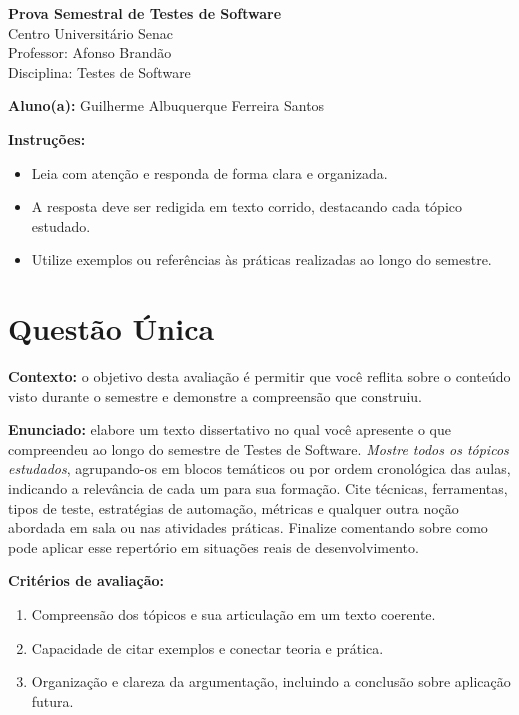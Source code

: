 \documentclass[12pt]{article}
\begin{document}
\newpage


\begin{center}
  {\Large \textbf{Prova Semestral de Testes de Software}}\\
  Centro Universitário Senac\\
  Professor: Afonso Brandão\\
  Disciplina: Testes de Software
\end{center}

\vspace{0.4cm}

\begin{center}
  \textbf{Aluno(a):} Guilherme Albuquerque Ferreira Santos
\end{center}

\vspace{0.5cm}

\begin{center}
  \textbf{Instruções:}
\end{center}
\begin{itemize}[leftmargin=*]
  \item Leia com atenção e responda de forma clara e organizada.
  \item A resposta deve ser redigida em texto corrido, destacando cada tópico estudado.
  \item Utilize exemplos ou referências às práticas realizadas ao longo do semestre.
\end{itemize}

\section*{Questão Única}
\textbf{Contexto:} o objetivo desta avaliação é permitir que você reflita sobre o conteúdo visto durante o semestre e demonstre a compreensão que construiu.

\textbf{Enunciado:} elabore um texto dissertativo no qual você apresente o que compreendeu ao longo do semestre de Testes de Software. \textit{Mostre todos os tópicos estudados}, agrupando-os em blocos temáticos ou por ordem cronológica das aulas, indicando a relevância de cada um para sua formação. Cite técnicas, ferramentas, tipos de teste, estratégias de automação, métricas e qualquer outra noção abordada em sala ou nas atividades práticas. Finalize comentando sobre como pode aplicar esse repertório em situações reais de desenvolvimento.

\textbf{Critérios de avaliação:}
\begin{enumerate}[label=\arabic*.]
  \item Compreensão dos tópicos e sua articulação em um texto coerente.
  \item Capacidade de citar exemplos e conectar teoria e prática.
  \item Organização e clareza da argumentação, incluindo a conclusão sobre aplicação futura.
\end{enumerate}
\end{document}
